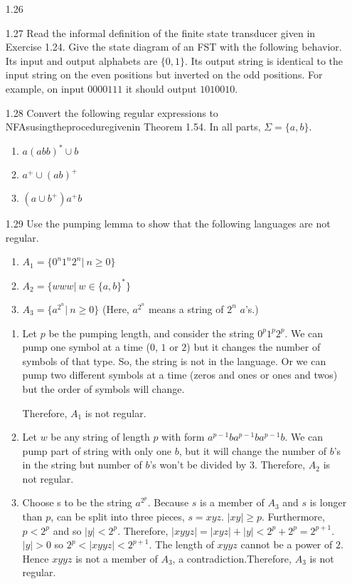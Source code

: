 \begin{enumerate}

    \item [1.26]
    \item [1.27]
          Read the informal definition of the finite state transducer given in Exercise 1.24. Give the state diagram of an FST with the following behavior. Its input and output alphabets are $\{0,1\}$. Its output string is identical to the input string on the even positions but inverted on the odd positions. For example, on input $0000111$ it should output $1010010$.

    \item [1.28]
          Convert the following regular expressions to NFAsusingtheproceduregivenin Theorem 1.54. In all parts, $\Sigma=\{a,b\}$. \begin{enumerate}
              \item $a(abb)^\ast \cup b$
              \item $a^+ \cup (ab)^+$
              \item $(a \cup b^+)a^+b$
          \end{enumerate}
    \item [1.29]
          Use the pumping lemma to show that the following languages are not regular.
          \begin{enumerate}
              \item $A_1 =\{0^n 1^n 2^n | ~n \geq 0\}$
              \item $A_2 =\{www|~w \in \{a,b\}^\ast\}$
              \item $A_3 = \{ a^{2^n} | ~n \geq 0\}$  (Here, $a^{2^n}$ means a string of $2^n$ $a$’s.)
          \end{enumerate}

          \begin{enumerate}
              \item Let $p$ be the pumping length, and consider the string $0^p 1^p 2^p$. We can pump one symbol at a time ($0$, $1$ or $2$) but it changes the number of symbols of that type. So, the string is not in the language. Or we can pump two different symbols at a time (zeros and ones or ones and twos) but the order of symbols will change.

                    Therefore, $A_1$ is not regular.

              \item Let $w$ be any string of length $p$ with form $a^{p-1}ba^{p-1}ba^{p-1}b$. We can pump part of string with only one $b$, but it will change the number of $b$'s in the string but number of $b$'s won't be divided by 3. Therefore, $A_2$ is not regular.

              \item Choose s to be the string $a^{2^p}$. Because $s$ is a member of $A_3$ and $s$ is longer than $p$, can be split into three pieces, $s = xyz$. $|xy|\geq p$. Furthermore, $p < 2^p$ and so $|y| < 2^p$. Therefore, $|xyyz| = |xyz|+|y| < 2^p+2^p =2^{p+1}$. $|y| > 0$ so $2^p < |xyyz| < 2^{p+1}$. The length of $xyyz$ cannot be a power of $2$. Hence $xyyz$ is not a member of $A_3$, a contradiction.Therefore, $A_3$ is not regular.
          \end{enumerate}
\end{enumerate}
